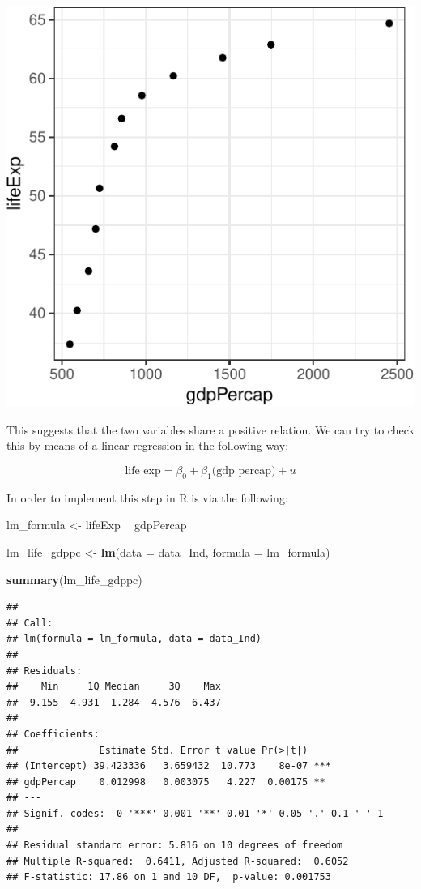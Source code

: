 \documentclass[12pt,]{article}
\newenvironment{Shaded}{\begin{snugshade}}{\end{snugshade}}
\newcommand{\KeywordTok}[1]{\textcolor[rgb]{0.13,0.29,0.53}{\textbf{#1}}}
\newcommand{\DataTypeTok}[1]{\textcolor[rgb]{0.13,0.29,0.53}{#1}}
\newcommand{\StringTok}[1]{\textcolor[rgb]{0.31,0.60,0.02}{#1}}
\newcommand{\OperatorTok}[1]{\textcolor[rgb]{0.81,0.36,0.00}{\textbf{#1}}}
\newcommand{\NormalTok}[1]{#1}
\begin{document}
\begin{center}\includegraphics{Intro_tips_tricks_files/figure-latex/data_Ind_scatter-1} \end{center}

This suggests that the two variables share a positive relation. We can
try to check this by means of a linear regression in the following way:

\[
\text{life exp} = \beta_0 + \beta_1 \text{(gdp percap)} + u
\]

In order to implement this step in R is via the following:

\begin{Shaded}
\begin{Highlighting}[]
\NormalTok{lm_formula <-}\StringTok{ }\NormalTok{lifeExp }\OperatorTok{~}\StringTok{ }\NormalTok{gdpPercap}

\NormalTok{lm_life_gdppc <-}\StringTok{ }\KeywordTok{lm}\NormalTok{(}\DataTypeTok{data =}\NormalTok{ data_Ind, }\DataTypeTok{formula =}\NormalTok{ lm_formula)}

\KeywordTok{summary}\NormalTok{(lm_life_gdppc)}
\end{Highlighting}
\end{Shaded}

\begin{verbatim}
## 
## Call:
## lm(formula = lm_formula, data = data_Ind)
## 
## Residuals:
##    Min     1Q Median     3Q    Max 
## -9.155 -4.931  1.284  4.576  6.437 
## 
## Coefficients:
##              Estimate Std. Error t value Pr(>|t|)    
## (Intercept) 39.423336   3.659432  10.773    8e-07 ***
## gdpPercap    0.012998   0.003075   4.227  0.00175 ** 
## ---
## Signif. codes:  0 '***' 0.001 '**' 0.01 '*' 0.05 '.' 0.1 ' ' 1
## 
## Residual standard error: 5.816 on 10 degrees of freedom
## Multiple R-squared:  0.6411, Adjusted R-squared:  0.6052 
## F-statistic: 17.86 on 1 and 10 DF,  p-value: 0.001753
\end{verbatim}
\end{document}
